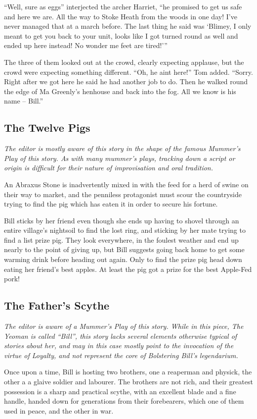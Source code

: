 “Well, sure as eggs” interjected the archer Harriet, “he promised to get us safe and here we are. All the way to Stoke Heath from the woods in one day! I've never managed that at a march before. The last thing he said was ‘Blimey, I only meant to get you back to your unit, looks like I got turned round as well and ended up here instead! No wonder me feet are tired!’”

The three of them looked out at the crowd, clearly expecting applause, but the crowd were expecting something different. “Oh, he aint here!” Tom added. “Sorry. Right after we got here he said he had another job to do. Then he walked round the edge of Ma Greenly's henhouse and back into the fog. All we know is his name -- Bill.”
\subsection{The Twelve Pigs}
\textit{The editor is mostly aware of this story in the shape of the famous Mummer’s Play of this story. As with many mummer's plays, tracking down a script or origin is difficult for their nature of improvisation and oral tradition.}

An Abraxus Stone is inadvertently mixed in with the feed for a herd of swine on their way to market, and the penniless protagonist must scour the countryside trying to find the pig which has eaten it in order to secure his fortune. 

Bill sticks by her friend even though she ends up having to shovel through an entire village's nightsoil to find the lost ring, and sticking by her mate trying to find a list prize pig. They look everywhere, in the foulest weather and end up nearly to the point of giving up, but Bill suggests going back home to get some warming drink before heading out again. Only to find the prize pig head down eating her friend's best apples. At least the pig got a prize for the best Apple-Fed pork!
\subsection{The Father's Scythe}
\textit{The editor is aware of a Mummer’s Play of this story. While in this piece, The Yeoman is called “Bill”, this story lacks several elements otherwise typical of stories about her, and may in this case mostly point to the invocation of the virtue of Loyalty, and not represent the core of Bolstering Bill's legendarium.}

Once upon a time, Bill is hosting two brothers, one a reaperman and physick, the other a a glaive soldier and labourer. The brothers are not rich, and their greatest possession is a sharp and practical scythe, with an excellent blade and a fine handle, handed down for generations from their forebearers, which one of them used in peace, and the other in war.

